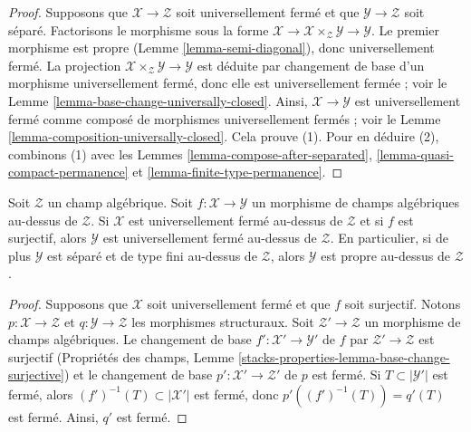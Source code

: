 \begin{proof}
Supposons que $\mathcal{X} \to \mathcal{Z}$ soit universellement fermé et que
$\mathcal{Y} \to \mathcal{Z}$ soit séparé.
Factorisons le morphisme sous la forme
$\mathcal{X} \to \mathcal{X} \times_\mathcal{Z} \mathcal{Y} \to \mathcal{Y}$.
Le premier morphisme est propre (Lemme \ref{lemma-semi-diagonal}),
donc universellement fermé.
La projection $\mathcal{X} \times_\mathcal{Z} \mathcal{Y} \to \mathcal{Y}$
est déduite par changement de base d'un morphisme universellement fermé, donc
elle est universellement fermée ; voir le
Lemme \ref{lemma-base-change-universally-closed}.
Ainsi, $\mathcal{X} \to \mathcal{Y}$ est universellement fermé comme composé
de morphismes universellement fermés ; voir le
Lemme \ref{lemma-composition-universally-closed}.
Cela prouve (1). Pour en déduire (2), combinons (1) avec les
Lemmes \ref{lemma-compose-after-separated},
\ref{lemma-quasi-compact-permanence} et
\ref{lemma-finite-type-permanence}.
\end{proof}

\begin{lemma}
\label{lemma-image-proper-is-proper}
Soit $\mathcal{Z}$ un champ algébrique.
Soit $f : \mathcal{X} \to \mathcal{Y}$
un morphisme de champs algébriques au-dessus de $\mathcal{Z}$.
Si $\mathcal{X}$ est universellement fermé au-dessus de $\mathcal{Z}$
et si $f$ est surjectif, alors $\mathcal{Y}$
est universellement fermé au-dessus de $\mathcal{Z}$.
En particulier, si de plus $\mathcal{Y}$ est
séparé et de type fini au-dessus de $\mathcal{Z}$,
alors $\mathcal{Y}$ est propre au-dessus de $\mathcal{Z}$.
\end{lemma}

\begin{proof}
Supposons que $\mathcal{X}$ soit universellement fermé et que $f$ soit surjectif.
Notons $p : \mathcal{X} \to \mathcal{Z}$ et
$q : \mathcal{Y} \to \mathcal{Z}$ les morphismes structuraux.
Soit $\mathcal{Z}' \to \mathcal{Z}$ un morphisme de champs algébriques.
Le changement de base $f' : \mathcal{X}' \to \mathcal{Y}'$
de $f$ par $\mathcal{Z}' \to \mathcal{Z}$ est surjectif
(Propriétés des champs, Lemme
\ref{stacks-properties-lemma-base-change-surjective}) et le changement
de base $p' : \mathcal{X}' \to \mathcal{Z}'$ de $p$ est fermé.
Si $T \subset |\mathcal{Y}'|$ est fermé, alors
$(f')^{-1}(T) \subset |\mathcal{X}'|$ est fermé, donc
$p'((f')^{-1}(T)) = q'(T)$ est fermé. Ainsi, $q'$ est fermé.
\end{proof}






